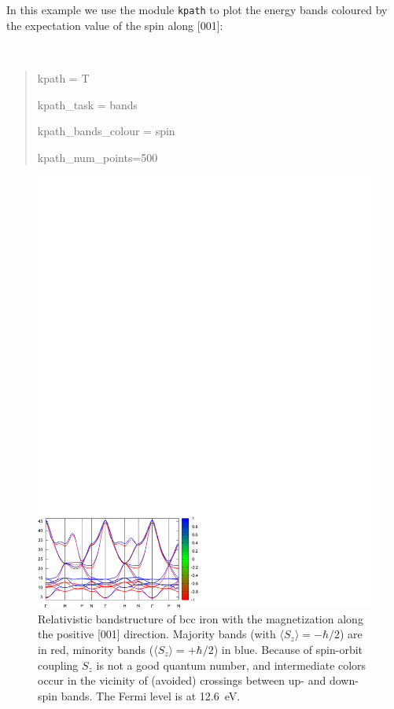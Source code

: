 \documentclass[a4paper,11pt,twoside]{article}
\begin{document}
 In this example we use the module {\tt kpath} to plot the energy
  bands coloured by the expectation value of the spin along [001]:
  {\tt
\begin{quote}
kpath = T

kpath\_task = bands

kpath\_bands\_colour = spin     

kpath\_num\_points=500
\end{quote} }

\begin{figure}[h]
\begin{center}
\includegraphics[width=12cm]{Fe_bands}
\caption{Relativistic bandstructure of bcc iron with the magnetization
  along the positive [001] direction. Majority bands (with $\langle
  S_z\rangle=-\hbar/2$) are in red, minority bands ($\langle
  S_z\rangle =+\hbar/2$) in blue. Because of spin-orbit coupling $S_z$
  is not a good quantum number, and intermediate colors occur in the
  vicinity of (avoided) crossings between up- and down-spin bands.
  The Fermi level is at 12.6~eV.}
\label{fig:fe-bnd}
\end{center}
\end{figure}
\end{document}
